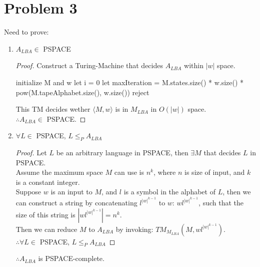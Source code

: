 \documentclass[letterpaper]{article}
\begin{document}
\section*{Problem 3}
Need to prove:
\begin{enumerate}
    \item $A_{LBA} \in$ PSPACE \begin{proof}
        Construct a Turing-Machine that decides $A_{LBA}$ within $|w|$ space.\\
        \begin{algorithm}[H]
            \caption{$TM_{A_{LBA}}(M, w)$}
            initialize M and w\;
            let i = 0\;
            let maxIteration = M.states.size() * w.size() * pow(M.tapeAlphabet.size(), w.size())\;
            reject\;
        \end{algorithm}
        This TM decides wether $\langle M, w \rangle$ is in $M_{LBA}$ in $O(|w|)$ space.\\
        $\therefore A_{LBA} \in$ PSPACE.
    \end{proof}
    \item $\forall L \in$ PSPACE, $L\leq_P A_{LBA}$ \begin{proof}
        Let $L$ be an arbitrary language in PSPACE, then $\exists M$ that decides $L$ in PSPACE.\\
        Assume the maximum space $M$ can use is $n^k$, where $n$ is size of input, and $k$ is a constant integer.\\
        Suppose $w$ is an input to $M$, and $l$ is a symbol in the alphabet of $L$, then we can construct a string by 
        concatenating $l^{|w|^{k-1}}$ to $w$: $wl^{|w|^{k-1}}$, such that the size of this string is $|wl^{|w|^{k-1}}|=n^k$.\\
        Then we can reduce $M$ to $A_{LBA}$ by invoking: $TM_{M_{LBA}}(M, wl^{|w|^{k-1}})$.\\
        $\therefore \forall L \in$ PSPACE, $L\leq_P A_{LBA}$
    \end{proof}

    $\therefore A_{LBA}$ is PSPACE-complete.
\end{enumerate}
\end{document}
